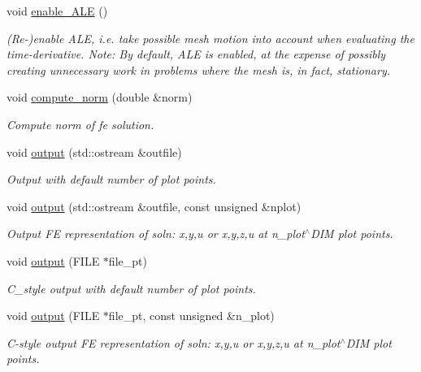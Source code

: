 \begin{DoxyCompactItemize}
void \hyperlink{classoomph_1_1UnsteadyHeatEquations_a38abdb9f1afd465289bb31d684daa360}{enable\+\_\+\+A\+LE} ()
\begin{DoxyCompactList}\small\item\em (Re-\/)enable A\+LE, i.\+e. take possible mesh motion into account when evaluating the time-\/derivative. Note\+: By default, A\+LE is enabled, at the expense of possibly creating unnecessary work in problems where the mesh is, in fact, stationary. \end{DoxyCompactList}\item 
void \hyperlink{classoomph_1_1UnsteadyHeatEquations_a0b5413cd78f410efd7ab3273a34cca5f}{compute\+\_\+norm} (double \&norm)
\begin{DoxyCompactList}\small\item\em Compute norm of fe solution. \end{DoxyCompactList}\item 
void \hyperlink{classoomph_1_1UnsteadyHeatEquations_a1d73897c7329f0b82f29542cb5c72fff}{output} (std\+::ostream \&outfile)
\begin{DoxyCompactList}\small\item\em Output with default number of plot points. \end{DoxyCompactList}\item 
void \hyperlink{classoomph_1_1UnsteadyHeatEquations_a68794ad133c4a06bed09488cc7cd5e94}{output} (std\+::ostream \&outfile, const unsigned \&nplot)
\begin{DoxyCompactList}\small\item\em Output FE representation of soln\+: x,y,u or x,y,z,u at n\+\_\+plot$^\wedge$\+D\+IM plot points. \end{DoxyCompactList}\item 
void \hyperlink{classoomph_1_1UnsteadyHeatEquations_a1e8bd563df8386a5935be50dc5d3d640}{output} (F\+I\+LE $\ast$file\+\_\+pt)
\begin{DoxyCompactList}\small\item\em C\+\_\+style output with default number of plot points. \end{DoxyCompactList}\item 
void \hyperlink{classoomph_1_1UnsteadyHeatEquations_aa63371c8600cb17a05b7bd00d89d1d2b}{output} (F\+I\+LE $\ast$file\+\_\+pt, const unsigned \&n\+\_\+plot)
\begin{DoxyCompactList}\small\item\em C-\/style output FE representation of soln\+: x,y,u or x,y,z,u at n\+\_\+plot$^\wedge$\+D\+IM plot points. \end{DoxyCompactList}\item 

\end{DoxyCompactItemize}
